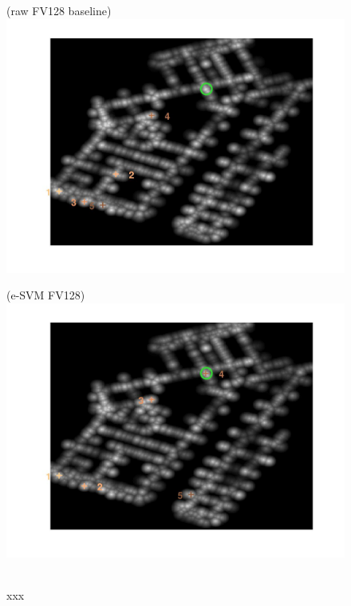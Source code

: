\documentclass[10pt,onecolumn,A4]{article}
\begin{document}
\begin{figure}
	\begin{minipage}{0.45\linewidth}
		\center
		(raw FV128 baseline) \\
		\includegraphics[trim = 55mm 40mm 55mm 25mm, clip=true,width=\linewidth]{sup2569/heatRaw.jpg}
	\end{minipage} 
	\begin{minipage}{0.45\linewidth}
		\center
		(e-SVM FV128) \\
		\includegraphics[trim = 55mm 40mm 55mm 25mm, clip=true,width=\linewidth]{sup2569/heatSvm.jpg}
	\end{minipage} 
	\\
	\textcolor{myWhite}{xxx}\\

\end{figure}
\end{document}
